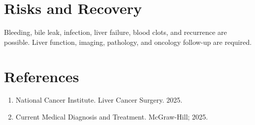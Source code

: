 \section*{Risks and Recovery}
Bleeding, bile leak, infection, liver failure, blood clots, and recurrence are possible. Liver function, imaging, pathology, and oncology follow-up are required.
\section*{References}
\begin{enumerate}\item National Cancer Institute. Liver Cancer Surgery. 2025.\item Current Medical Diagnosis and Treatment. McGraw-Hill; 2025.\end{enumerate}
\clearpage
